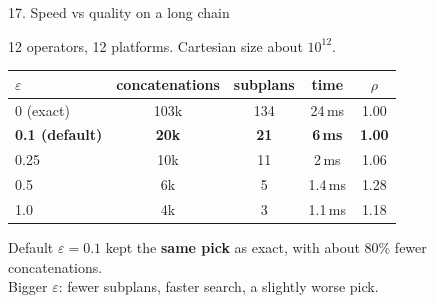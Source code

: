 \documentclass[aspectratio=169,11pt]{beamer}
\begin{document}
\begin{frame}{17. Speed vs quality on a long chain}

\vspace{0.1cm}
\centering
{\small 12 operators, 12 platforms. Cartesian size about \(10^{12}\).}

\vspace{0.35cm}
\renewcommand{\arraystretch}{1.28}
\setlength{\tabcolsep}{10pt}
{\small
\begin{tabular}{@{}lcccc@{}}
\toprule
\(\varepsilon\) & concatenations & subplans & time & \(\rho\) \\
\midrule
0 (exact) & 103k & 134 & 24\,ms & 1.00 \\
\textbf{0.1 (default)} & \textbf{20k} & \textbf{21} & \textbf{6\,ms} & \textbf{1.00} \\
0.25 & 10k & 11 & 2\,ms & 1.06 \\
0.5 & 6k & 5 & 1.4\,ms & 1.28 \\
1.0 & 4k & 3 & 1.1\,ms & 1.18 \\
\bottomrule
\end{tabular}}

\vspace{0.45cm}
{\small
Default \(\varepsilon=0.1\) kept the \textbf{same pick} as exact, with about 80\% fewer concatenations.\\[4pt]
Bigger \(\varepsilon\): fewer subplans, faster search, a slightly worse pick.}
\end{frame}
\end{document}
